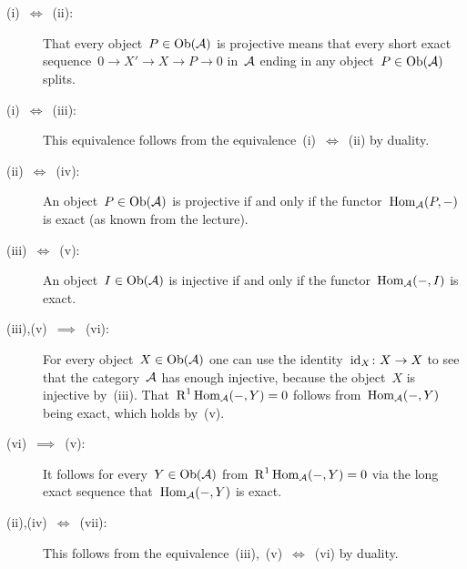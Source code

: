 \section{}


\begin{description}
  \item[(i)~$\iff$~(ii):]
    That every object~$P \in \operatorname{Ob}(\mathcal{A})$ is projective means that every short exact sequence~$0 \to X' \to X \to P \to 0$ in~$\mathcal{A}$ ending in any object~$P \in \operatorname{Ob}(\mathcal{A})$ splits.
  \item[(i)~$\iff$~(iii):]
    This equivalence follows from the equivalence~(i)~$\iff$~(ii) by duality.
  \item[(ii)~$\iff$~(iv):]
    An object~$P \in \operatorname{Ob}(\mathcal{A})$ is projective if and only if the functor~$\operatorname{Hom}_{\mathcal{A}}(P,-)$ is exact (as known from the lecture).
  \item[(iii)~$\iff$~(v):]
    An object~$I \in \operatorname{Ob}(\mathcal{A})$ is injective if and only if the functor~$\operatorname{Hom}_{\mathcal{A}}(-,I)$ is exact.
  \item[(iii),(v)~$\implies$~(vi):]
    For every object~$X \in \operatorname{Ob}(\mathcal{A})$ one can use the identity~$\operatorname{id}_{X} \colon X \to X$ to see that the category~$\mathcal{A}$ has enough injective, because the object~$X$ is injective by~(iii).
    That~$\operatorname{R}^1 \operatorname{Hom}_{\mathcal{A}}(-,Y) = 0$ follows from~$\operatorname{Hom}_{\mathcal{A}}(-,Y)$ being exact, which holds by~(v).
  \item[(vi)~$\implies$~(v):]
    It follows for every~$Y \in \operatorname{Ob}(\mathcal{A})$ from~$\operatorname{R}^1 \operatorname{Hom}_{\mathcal{A}}(-,Y) = 0$ via the long exact sequence that~$\operatorname{Hom}_{\mathcal{A}}(-,Y)$ is exact.
  \item[(ii),(iv)~$\iff$~(vii):]
    This follows from the equivalence~(iii),~(v)~$\iff$~(vi) by duality.
\end{description}
